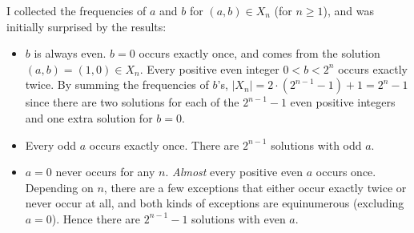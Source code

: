 \documentclass[1gpt]{article}
\theoremstyle{break}
\begin{document}
I collected the frequencies of $a$ and $b$ for $(a, b) \in X_n$ (for $n \geq
1$), and was initially surprised by the results:

\begin{itemize}

    \item

        $b$ is always even. $b = 0$ occurs exactly once, and comes from the
        solution $(a, b) = (1, 0) \in X_n$. Every positive even integer $0 < b
        < 2^n$ occurs exactly twice. By summing the frequencies of $b$'s,
        $|X_n| = 2 \cdot (2^{n-1} - 1) + 1 = 2^n - 1$ since there are two
        solutions for each of the $2^{n-1} - 1$ even positive integers and one
        extra solution for $b=0$.

    \item

        Every odd $a$ occurs exactly once. There are $2^{n-1}$ solutions with
        odd $a$.

    \item

        $a=0$ never occurs for any $n$. \textit{Almost} every positive even $a$
        occurs once. Depending on $n$, there are a few exceptions that either
        occur exactly twice or never occur at all, and both kinds of exceptions
        are equinumerous (excluding $a=0$). Hence there are $2^{n-1}-1$
        solutions with even $a$.



\end{itemize}
\end{document}

